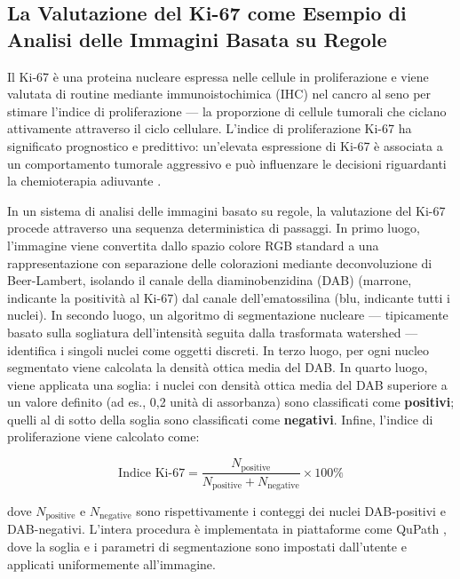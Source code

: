 \subsection{La Valutazione del Ki-67 come Esempio di Analisi delle Immagini Basata su Regole}

Il Ki-67 è una proteina nucleare espressa nelle cellule in proliferazione e viene valutata di routine mediante immunoistochimica (IHC) nel cancro al seno per stimare l'indice di proliferazione — la proporzione di cellule tumorali che ciclano attivamente attraverso il ciclo cellulare. L'indice di proliferazione Ki-67 ha significato prognostico e predittivo: un'elevata espressione di Ki-67 è associata a un comportamento tumorale aggressivo e può influenzare le decisioni riguardanti la chemioterapia adiuvante \cite{bankhead2022}.

In un sistema di analisi delle immagini basato su regole, la valutazione del Ki-67 procede attraverso una sequenza deterministica di passaggi. In primo luogo, l'immagine viene convertita dallo spazio colore RGB standard a una rappresentazione con separazione delle colorazioni mediante deconvoluzione di Beer-Lambert, isolando il canale della diaminobenzidina (DAB) (marrone, indicante la positività al Ki-67) dal canale dell'ematossilina (blu, indicante tutti i nuclei). In secondo luogo, un algoritmo di segmentazione nucleare — tipicamente basato sulla sogliatura dell'intensità seguita dalla trasformata watershed — identifica i singoli nuclei come oggetti discreti. In terzo luogo, per ogni nucleo segmentato viene calcolata la densità ottica media del DAB. In quarto luogo, viene applicata una soglia: i nuclei con densità ottica media del DAB superiore a un valore definito (ad es., 0,2 unità di assorbanza) sono classificati come \textbf{positivi}; quelli al di sotto della soglia sono classificati come \textbf{negativi}. Infine, l'indice di proliferazione viene calcolato come:

\begin{equation}
    \text{Indice Ki-67} = \frac{N_{\text{positive}}}{N_{\text{positive}} + N_{\text{negative}}} \times 100\%
\end{equation}

dove $N_{\text{positive}}$ e $N_{\text{negative}}$ sono rispettivamente i conteggi dei nuclei DAB-positivi e DAB-negativi. L'intera procedura è implementata in piattaforme come QuPath \cite{bankhead2017}, dove la soglia e i parametri di segmentazione sono impostati dall'utente e applicati uniformemente all'immagine.

